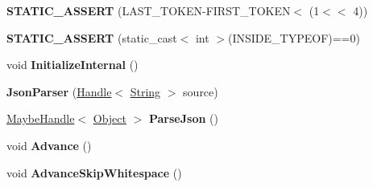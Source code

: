 \begin{DoxyCompactItemize}
\item 
{\bfseries S\+T\+A\+T\+I\+C\+\_\+\+A\+S\+S\+E\+RT} (L\+A\+S\+T\+\_\+\+T\+O\+K\+EN-\/F\+I\+R\+S\+T\+\_\+\+T\+O\+K\+EN$<$ (1$<$$<$ 4))\hypertarget{classv8_1_1internal_1_1_b_a_s_e___e_m_b_e_d_d_e_d_afffd1a08c34c31fb4483caa96a1a0cb4}{}\label{classv8_1_1internal_1_1_b_a_s_e___e_m_b_e_d_d_e_d_afffd1a08c34c31fb4483caa96a1a0cb4}

\item 
{\bfseries S\+T\+A\+T\+I\+C\+\_\+\+A\+S\+S\+E\+RT} (static\+\_\+cast$<$ int $>$(I\+N\+S\+I\+D\+E\+\_\+\+T\+Y\+P\+E\+OF)==0)\hypertarget{classv8_1_1internal_1_1_b_a_s_e___e_m_b_e_d_d_e_d_a4fb5bf65fcc2a307280b6b865fd85977}{}\label{classv8_1_1internal_1_1_b_a_s_e___e_m_b_e_d_d_e_d_a4fb5bf65fcc2a307280b6b865fd85977}

\item 
void {\bfseries Initialize\+Internal} ()\hypertarget{classv8_1_1internal_1_1_b_a_s_e___e_m_b_e_d_d_e_d_a6b6e49609d0d9cda9eb9294d9aae9837}{}\label{classv8_1_1internal_1_1_b_a_s_e___e_m_b_e_d_d_e_d_a6b6e49609d0d9cda9eb9294d9aae9837}

\item 
{\bfseries Json\+Parser} (\hyperlink{classv8_1_1internal_1_1_handle}{Handle}$<$ \hyperlink{classv8_1_1internal_1_1_string}{String} $>$ source)\hypertarget{classv8_1_1internal_1_1_b_a_s_e___e_m_b_e_d_d_e_d_a24daf414a89609c910aba8cecd6728f6}{}\label{classv8_1_1internal_1_1_b_a_s_e___e_m_b_e_d_d_e_d_a24daf414a89609c910aba8cecd6728f6}

\item 
\hyperlink{classv8_1_1internal_1_1_maybe_handle}{Maybe\+Handle}$<$ \hyperlink{classv8_1_1internal_1_1_object}{Object} $>$ {\bfseries Parse\+Json} ()\hypertarget{classv8_1_1internal_1_1_b_a_s_e___e_m_b_e_d_d_e_d_affdad93a052eb698d61f7ff59717ed76}{}\label{classv8_1_1internal_1_1_b_a_s_e___e_m_b_e_d_d_e_d_affdad93a052eb698d61f7ff59717ed76}

\item 
void {\bfseries Advance} ()\hypertarget{classv8_1_1internal_1_1_b_a_s_e___e_m_b_e_d_d_e_d_a3d99e222f406f37deb9382e9e370b68a}{}\label{classv8_1_1internal_1_1_b_a_s_e___e_m_b_e_d_d_e_d_a3d99e222f406f37deb9382e9e370b68a}

\item 
void {\bfseries Advance\+Skip\+Whitespace} ()\hypertarget{classv8_1_1internal_1_1_b_a_s_e___e_m_b_e_d_d_e_d_aea7776160070058dbec38871837670dc}{}\label{classv8_1_1internal_1_1_b_a_s_e___e_m_b_e_d_d_e_d_aea7776160070058dbec38871837670dc}


\end{DoxyCompactItemize}
